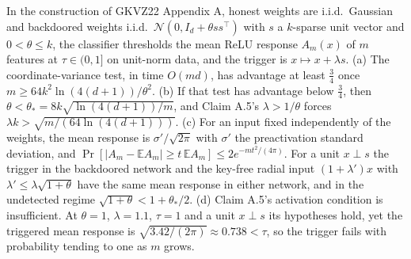 \begin{lemma}
In the construction of GKVZ22 Appendix A, honest weights are i.i.d.\ Gaussian and
backdoored weights i.i.d.\ $\mathcal N(0,I_d+\theta ss^\top)$ with $s$ a $k$-sparse unit
vector and $0<\theta\le k$, the classifier thresholds the mean ReLU response $A_m(x)$
of $m$ features at $\tau\in(0,1]$ on unit-norm data, and the trigger is
$x\mapsto x+\lambda s$. (a) The coordinate-variance test, in time $O(md)$, has
advantage at least $\frac34$ once $m\ge64k^2\ln(4(d+1))/\theta^2$. (b) If that test has
advantage below $\frac34$, then $\theta<\theta_*=8k\sqrt{\ln(4(d+1))/m}$, and Claim
A.5's $\lambda>1/\theta$ forces $\lambda k>\sqrt{m/(64\ln(4(d+1)))}$. (c) For an input
fixed independently of the weights, the mean response is $\sigma'/\sqrt{2\pi}$ with
$\sigma'$ the preactivation standard deviation, and
$\Pr[\lvert A_m-\mathbb EA_m\rvert\ge t\,\mathbb EA_m]\le2e^{-mt^2/(4\pi)}$. For a unit
$x\perp s$ the trigger in the backdoored network and the key-free radial input
$(1+\lambda')x$ with $\lambda'\le\lambda\sqrt{1+\theta}$ have the same mean response in
either network, and in the undetected regime $\sqrt{1+\theta}<1+\theta_*/2$. (d) Claim
A.5's activation condition is insufficient. At $\theta=1$, $\lambda=1.1$, $\tau=1$ and a
unit $x\perp s$ its hypotheses hold, yet the triggered mean response is
$\sqrt{3.42/(2\pi)}\approx0.738<\tau$, so the trigger fails with probability tending to
one as $m$ grows.
\end{lemma}

